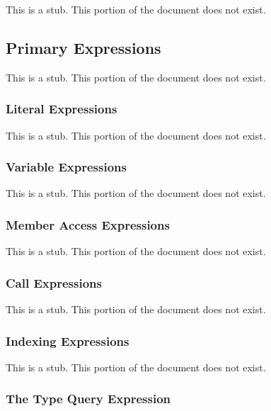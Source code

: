 \label{Expressions}

This is a stub.  This portion of the document does not exist.

\subsection{Primary Expressions}
\label{Primary_Expressions}

This is a stub.  This portion of the document does not exist.

\subsubsection{Literal Expressions}
\label{Literal_Expressions}

This is a stub.  This portion of the document does not exist.

\subsubsection{Variable Expressions}
\label{Variable_Expressions}

This is a stub.  This portion of the document does not exist.

\subsubsection{Member Access Expressions}
\label{Member_Access_Expressions}

This is a stub.  This portion of the document does not exist.

\subsubsection{Call Expressions}
\label{Call_Expressions}

This is a stub.  This portion of the document does not exist.

\subsubsection{Indexing Expressions}
\label{Indexing_Expressions}

This is a stub.  This portion of the document does not exist.

\subsubsection{The Type Query Expression}
\label{The_Type_Query_Expression}

